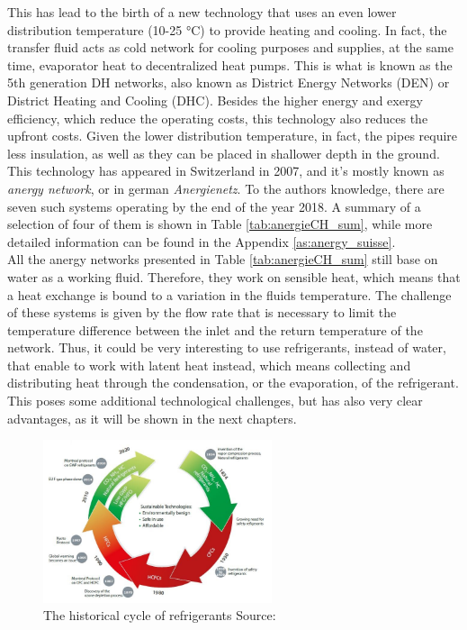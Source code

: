 \documentclass{article}
\begin{document}
This has lead to the birth of a new technology that uses an even lower distribution temperature (10-25 \si{\celsius}) to provide heating and cooling. In fact, the transfer fluid acts as cold network for cooling purposes and supplies, at the same time, evaporator heat to decentralized heat pumps. This is what is known as the 5th generation DH networks, also known as District Energy Networks (DEN) or District Heating and Cooling (DHC). Besides the higher energy and exergy efficiency, which reduce the operating costs, this technology also reduces the upfront costs. Given the lower distribution temperature, in fact, the pipes require less insulation, as well as they can be placed in shallower depth in the ground.\\

This technology has appeared in Switzerland in 2007, and it's mostly known as \textit{anergy network}, or in german \textit{Anergienetz}. To the authors knowledge, there are seven such systems operating by the end of the year 2018\cite{energieschweizFallbeispieleThermischeNetze2018}. A summary of a selection of four of them is shown in Table \ref{tab:anergieCH_sum}, while more detailed information can be found in the Appendix \ref{as:anergy_suisse}.\\



All the anergy networks presented in Table \ref{tab:anergieCH_sum} still base on water as a working fluid. Therefore, they work on sensible heat, which means that a heat exchange is bound to a variation in the fluids temperature. The challenge of these systems is given by the flow rate that is necessary to limit the temperature difference between the inlet and the return temperature of the network. Thus, it could be very interesting to use refrigerants, instead of water, that enable to work with latent heat instead, which means collecting and distributing heat through the condensation, or the evaporation, of the refrigerant. This poses some additional technological challenges, but has also very clear advantages, as it will be shown in the next chapters.\\

\begin{figure}[h!]
	\centering
	\includegraphics[width=0.6\textwidth]{refrigerants.JPG}
	\caption{The historical cycle of refrigerants Source: \cite{danfossRefrigerantOptionsNow2017}}
	\label{fig:refrigerants}
\end{figure}
\end{document}
